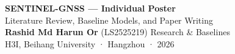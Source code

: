 \documentclass[20pt]{extarticle}
\begin{document}
\noindent
\begin{tcolorbox}[colback=buaaNavy,colframe=buaaNavy,boxrule=0pt,arc=8pt,
                  left=16pt,right=16pt,top=10pt,bottom=10pt]
  \begin{center}
    {\fontsize{46}{54}\bfseries\color{white} SENTINEL-GNSS — Individual Poster}\\[6pt]
    {\fontsize{26}{32}\color{buaaSky}
     Literature Review, Baseline Models, and Paper Writing}\\[8pt]
    {\large\color{white}
     \textbf{Rashid Md Harun Or} (LS2525219) \quad Research \& Baselines}\\[4pt]
    {\normalsize\color{white!70!buaaSky} H3I, Beihang University · Hangzhou · 2026}
  \end{center}
\end{tcolorbox}
\vspace{0.5cm}
\end{document}
